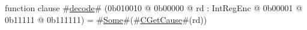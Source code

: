 function clause #\hyperref[sailMIPSzdecode]{decode}# (0b010010 @ 0b00000 @ rd : IntRegEnc @    0b00001 @    0b11111 @ 0b111111) = #\hyperref[sailMIPSzSome]{Some}#(#\hyperref[sailMIPSzCGetCause]{CGetCause}#(rd))
